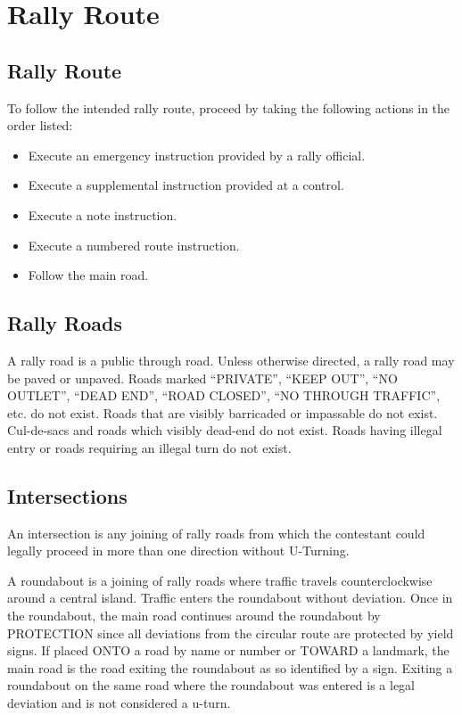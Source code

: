 \section{Rally Route}

\subsection{Rally Route}
To follow the intended rally route, proceed by taking the following actions in the order listed:

\begin{itemize}

\item Execute an emergency instruction provided by a rally official.

\item Execute a supplemental instruction provided at a control.

\item Execute a note instruction.

\item Execute a numbered route instruction.

\item Follow the main road.

\end{itemize}

\subsection{Rally Roads}
A rally road is a public through road.  Unless otherwise directed, a rally road may be paved or unpaved.  Roads marked ``PRIVATE'', ``KEEP OUT'', ``NO OUTLET'', ``DEAD END'', ``ROAD CLOSED'', ``NO THROUGH TRAFFIC'', etc. do not exist.  Roads that are visibly barricaded or impassable do not exist.  Cul-de-sacs and roads which visibly dead-end do not exist.  Roads having illegal entry or roads requiring an illegal turn do not exist.

\subsection{Intersections}
An intersection is any joining of rally roads from which the contestant could legally proceed in more than one direction without U-Turning.

A roundabout is a joining of rally roads where traffic travels counterclockwise around a central island.  Traffic enters the roundabout without deviation.  Once in the roundabout, the main road continues around the roundabout by PROTECTION since all deviations from the circular route are protected by yield signs.  If placed ONTO a road by name or number or TOWARD a landmark, the main road is the road exiting the roundabout as so identified by a sign.  Exiting a roundabout on the same road where the roundabout was entered is a legal deviation and is not considered a u-turn.


